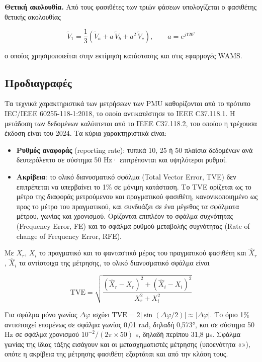 \textbf{Θετική ακολουθία.} Από τους φασιθέτες των τριών φάσεων υπολογίζεται ο φασιθέτης θετικής
ακολουθίας

\begin{equation}
\tilde{V}_1 = \frac{1}{3}\left(\tilde{V}_a + a\,\tilde{V}_b + a^2\,\tilde{V}_c\right),
\qquad a = e^{j120^\circ}
\label{eq:posseq}
\end{equation}

ο οποίος χρησιμοποιείται στην εκτίμηση κατάστασης και στις εφαρμογές WAMS.


\subsection{Προδιαγραφές}

Τα τεχνικά χαρακτηριστικά των μετρήσεων των PMU καθορίζονται από το πρότυπο IEC/IEEE
60255-118-1:2018, το οποίο αντικατέστησε το IEEE C37.118.1. Η μετάδοση των δεδομένων
καλύπτεται από το IEEE C37.118.2, του οποίου η τρέχουσα έκδοση είναι του 2024. Τα κύρια
χαρακτηριστικά είναι:

\begin{itemize}
\item \textbf{Ρυθμός αναφοράς} (reporting rate): τυπικά 10, 25 ή 50 πλαίσια δεδομένων ανά
      δευτερόλεπτο σε σύστημα 50 Hz· επιτρέπονται και υψηλότεροι ρυθμοί.
\item \textbf{Ακρίβεια}: το ολικό διανυσματικό σφάλμα (Total Vector Error, TVE) δεν
      επιτρέπεται να υπερβαίνει το 1\% σε μόνιμη κατάσταση. Το TVE ορίζεται ως το μέτρο της
      διαφοράς μετρούμενου και πραγματικού φασιθέτη, κανονικοποιημένο ως προς το μέτρο του
      πραγματικού, και συνδυάζει σε ένα μέγεθος τα σφάλματα μέτρου, γωνίας και χρονισμού.
      Ορίζονται επιπλέον το σφάλμα συχνότητας (Frequency Error, FE) και το σφάλμα ρυθμού
      μεταβολής συχνότητας (Rate of change of Frequency Error, RFE).
\end{itemize}

Με $X_r$, $X_i$ το πραγματικό και το φανταστικό μέρος του πραγματικού φασιθέτη και
$\hat{X}_r$, $\hat{X}_i$ τα αντίστοιχα της μέτρησης, το ολικό διανυσματικό σφάλμα είναι

\begin{equation}
\mathrm{TVE} = \sqrt{\frac{(\hat{X}_r - X_r)^2 + (\hat{X}_i - X_i)^2}{X_r^2 + X_i^2}}
\label{eq:tve}
\end{equation}

Για σφάλμα μόνο γωνίας $\Delta\varphi$ ισχύει
$\mathrm{TVE} = 2\left|\sin(\Delta\varphi/2)\right| \approx |\Delta\varphi|$. Το όριο 1\%
αντιστοιχεί επομένως σε σφάλμα γωνίας 0,01 rad, δηλαδή 0,573°, και σε σύστημα 50 Hz σε σφάλμα
χρονισμού $10^{-2} / (2\pi \times 50)$ s, δηλαδή περίπου 31,8 μs. Σφάλμα γωνίας της ίδιας
τάξης εισάγουν και οι μετασχηματιστές μέτρησης (υποενότητα «»), οπότε
η ακρίβεια της μέτρησης φασιθέτη εξαρτάται και από την κλάση τους.

